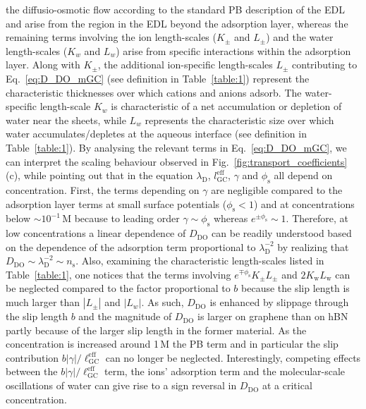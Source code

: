 \documentclass[journal=ancac3,manuscript=article,layout=twocolumn]{achemso}
\newcommand{\lGC}{\ell_\text{GC}}
\newcommand{\phis}{\phi_\text{s}}
\newcommand{\ns}{n_\text{s}}
\begin{document}
the diffusio-osmotic flow according to the standard PB description of
the EDL\cite{anderson1989colloid,Mouterde2018}
and arise from the region in the EDL beyond the adsorption layer, whereas
the remaining terms involving the ion length-scales
($K_\pm$ and $L_\pm$) and the water length-scales
($K_w$ and $L_w$) arise from specific
interactions within the adsorption layer.
Along with $K_{\pm}$, the additional ion-specific
length-scales $L_{\pm}$ contributing to Eq.~\eqref{eq:D_DO_mGC}
(see definition in Table~\ref{table:1})
represent the characteristic thicknesses over which cations and anions adsorb.
The water-specific length-scale $K_w$ is characteristic of
a net accumulation or depletion of water near the
sheets, while $L_w$ represents
the characteristic size
over which water accumulates/depletes
at the aqueous interface (see definition in Table~\ref{table:1}).
By analysing the relevant terms in
Eq.~\eqref{eq:D_DO_mGC}, we can
interpret the scaling behaviour observed in
Fig.~\ref{fig:transport_coefficients}(c),
while pointing out that in the equation
$\lambda_\text{D}$, $l^{\text{eff}}_{\text{GC}}$,
$\gamma$ and $\phis$ all depend on concentration.
First, the
terms depending on $\gamma$ are
negligible compared to the adsorption
layer terms at small surface
potentials ($\phis <1$)
and at concentrations
below $\sim 10^{-1}$\,M
because to leading order
$\gamma \sim \phis$ whereas $e^{\pm\phis} \sim 1$.
Therefore, at low concentrations
a linear dependence of $D_\text{DO}$
can be readily understood based on the dependence
of the adsorption term proportional
to $\lambda_\mathrm D^{-2}$
 by realizing that $D_\mathrm{DO} \sim \lambda_\mathrm D^{-2} \sim \ns$.
%
Also, examining the characteristic
length-scales
listed in Table~\ref{table:1}, one notices  that
the terms involving $e^{\mp \phis }K_{\pm} L_{\pm}$ and
$2 K_{\text{w}} L_{\text{w}}$  can be neglected
compared to the factor proportional to $b$
 because the slip length is much larger than
 $|L_\pm|$ and $|L_{w}|$.
As such, $D_\mathrm{DO}$ is enhanced by slippage through
the slip length $b$ and the magnitude of $D_\mathrm{DO}$
is larger on graphene than on hBN partly
because of the larger slip length
in the former material.
As the concentration is
increased around 1\,M the PB term and in
particular the slip contribution $b|\gamma|/\lGC^{\text{eff}}$
can no longer be neglected.
Interestingly, competing effects between
the $b|\gamma|/\lGC^{\text{eff}}$ term, the ions' adsorption
term and the molecular-scale oscillations
 of water can give rise to a sign reversal
 in $D_\text{DO}$ at a critical
 concentration.
\end{document}
